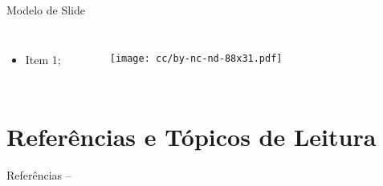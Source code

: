     \begin{frame}{Modelo de Slide}\vspace*{-2em}
        \begin{columns}
            \begin{itemize}
                \item<1-> Item 1;
            \end{itemize}
            \begin{figure}
                \texttt{[image: cc/by-nc-nd-88x31.pdf]}
            \end{figure}
        \end{columns}
    \end{frame}

\section{Referências e Tópicos de Leitura}

    \begin{frame}[allowframebreaks]{Referências -- }
        
        
    \end{frame}




